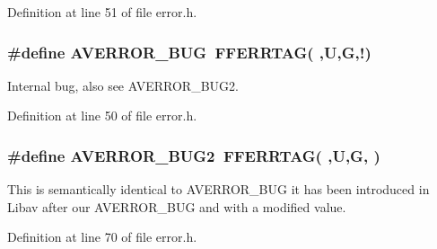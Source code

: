 Definition at line 51 of file error.\+h.

\subsubsection[{\texorpdfstring{A\+V\+E\+R\+R\+O\+R\+\_\+\+B\+UG}{AVERROR_BUG}}]{\setlength{\rightskip}{0pt plus 5cm}\#define A\+V\+E\+R\+R\+O\+R\+\_\+\+B\+UG~{\bf F\+F\+E\+R\+R\+T\+AG}( \textquotesingle{},\textquotesingle{}U\textquotesingle{},\textquotesingle{}G\textquotesingle{},\textquotesingle{}!\textquotesingle{})}\hypertarget{group__lavu__error_gaa102cde7ec5acbc099c3bcbb58556a18}{}\label{group__lavu__error_gaa102cde7ec5acbc099c3bcbb58556a18}


Internal bug, also see A\+V\+E\+R\+R\+O\+R\+\_\+\+B\+U\+G2. 



Definition at line 50 of file error.\+h.

\subsubsection[{\texorpdfstring{A\+V\+E\+R\+R\+O\+R\+\_\+\+B\+U\+G2}{AVERROR_BUG2}}]{\setlength{\rightskip}{0pt plus 5cm}\#define A\+V\+E\+R\+R\+O\+R\+\_\+\+B\+U\+G2~{\bf F\+F\+E\+R\+R\+T\+AG}( \textquotesingle{},\textquotesingle{}U\textquotesingle{},\textquotesingle{}G\textquotesingle{},\textquotesingle{} \textquotesingle{})}\hypertarget{group__lavu__error_gafdd5fd9898cc229e1856f858308d956e}{}\label{group__lavu__error_gafdd5fd9898cc229e1856f858308d956e}
This is semantically identical to A\+V\+E\+R\+R\+O\+R\+\_\+\+B\+UG it has been introduced in Libav after our A\+V\+E\+R\+R\+O\+R\+\_\+\+B\+UG and with a modified value. 

Definition at line 70 of file error.\+h.


